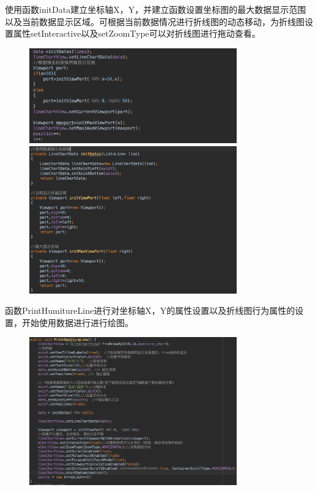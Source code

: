 \begin{enumerate}
使用函数initData建立坐标轴X，Y，并建立函数设置坐标图的最大数据显示范围以及当前数据显示区域。可根据当前数据情况进行折线图的动态移动，为折线图设置属性setInteractive以及setZoomType可以对折线图进行拖动查看。

\begin{figure}[htbp]
    \centering
    \includegraphics[width=0.8\textwidth]{figures/code/14}
    \includegraphics[width=0.8\textwidth]{figures/code/15}
\end{figure}

函数PrintHumitureLine进行对坐标轴X，Y的属性设置以及折线图行为属性的设置，开始使用数据进行进行绘图。

\begin{figure}[htbp]
    \centering
    \includegraphics[width=0.8\textwidth]{figures/code/16}
\end{figure}

\end{enumerate}

